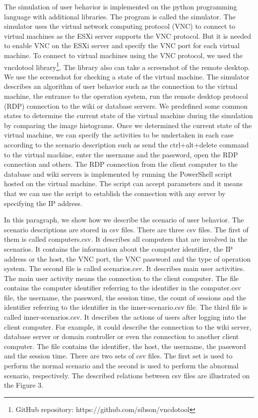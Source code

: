 The simulation of user behavior is implemented on the python programming language with additional libraries. The program is called the simulator. The simulator uses the virtual network computing protocol (VNC) to connect to virtual machines as the ESXi server supports the VNC protocol. But it is needed to enable VNC on the ESXi server and specify the VNC port for each virtual machine. To connect to virtual machines using the VNC protocol, we used the vncdotool library\footnote{GitHub repository: https://github.com/sibson/vncdotool}. The library also can take a screenshot of the remote desktop. We use the screenshot for checking a state of the virtual machine. The simulator describes an algorithm of user behavior such as the connection to the virtual machine, the entrance to the operation system, run the remote desktop protocol (RDP) connection to the wiki or database servers. We predefined some common states to determine the current state of the virtual machine during the simulation by comparing the image histograms. Once we determined the current state of the virtual machine, we can specify the activities to be undertaken in each case according to the scenario description such as send the ctrl+alt+delete command to the virtual machine, enter the username and the password, open the RDP connection and others. The RDP connection from the client computer to the database and wiki servers is implemented by running the PowerShell script hosted on the virtual machine. The script can accept parameters and it means that we can use the script to establish the connection with any server by specifying the IP address.

In this paragraph, we show how we describe the scenario of user behavior. The scenario descriptions are stored in csv files. There are three csv files. The first of them is called computers.csv. It describes all computers that are involved in the scenarios. It contains the information about the computer identifier, the IP address or the host, the VNC port, the VNC password and the type of operation system.
The second file is called scenarios.csv. It describes main user activities. The main user activity means the connection to the client computer. The file contains the computer identifier referring to the identifier in the computer.csv file, the username, the password, the session time, the count of sessions and the identifier referring to the identifier in the inner-scenario.csv file. The third file is called inner-scenarios.csv. It describes the actions of users after logging into the client computer. For example, it could describe the connection to the wiki server, database server or domain controller or even the connection to another client computer. The file contains the identifier, the host, the username, the password and the session time. There are two sets of csv files. The first set is used to perform the normal scenario and the second is used to perform the abnormal scenario, respectively. The described relations between csv files are illustrated on the Figure 3.
 	

